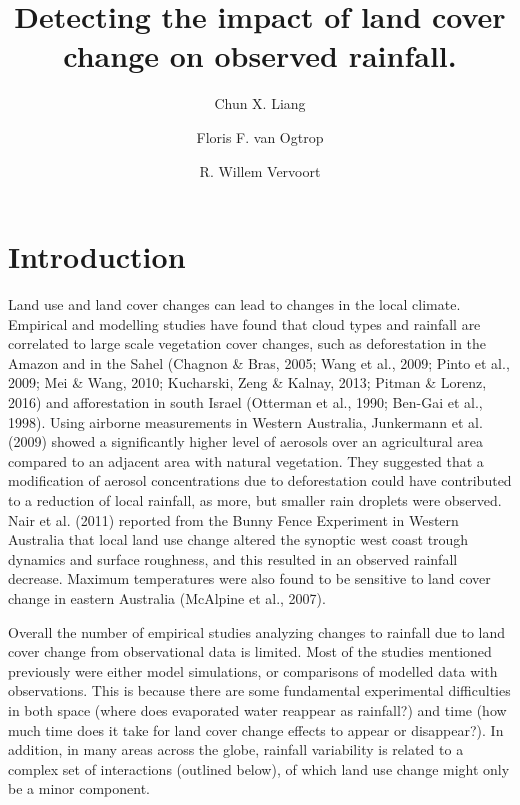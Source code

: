 \documentclass[fleqn,10pt,lineno]{wlpeerj} %
\title{Detecting the impact of land cover change on observed rainfall.}
\author[1]{Chun X. Liang}
\author[1]{Floris F. van Ogtrop}
\author[1]{R. Willem Vervoort}
\affil[1]{Sydney Institute of Agriculture, The University of Sydney, NSW 2006}
\theoremstyle{definition}
\theoremstyle{definition}
\theoremstyle{definition}
\theoremstyle{remark}
\begin{document}
\flushbottom
\maketitle
\thispagestyle{empty}

\section*{Introduction}\label{introduction}

Land use and land cover changes can lead to changes in the local
climate. Empirical and modelling studies have found that cloud types and
rainfall are correlated to large scale vegetation cover changes, such as
deforestation in the Amazon and in the Sahel (Chagnon \& Bras, 2005;
Wang et al., 2009; Pinto et al., 2009; Mei \& Wang, 2010; Kucharski,
Zeng \& Kalnay, 2013; Pitman \& Lorenz, 2016) and afforestation in south
Israel (Otterman et al., 1990; Ben-Gai et al., 1998). Using airborne
measurements in Western Australia, Junkermann et al. (2009) showed a
significantly higher level of aerosols over an agricultural area
compared to an adjacent area with natural vegetation. They suggested
that a modification of aerosol concentrations due to deforestation could
have contributed to a reduction of local rainfall, as more, but smaller
rain droplets were observed. Nair et al. (2011) reported from the Bunny
Fence Experiment in Western Australia that local land use change altered
the synoptic west coast trough dynamics and surface roughness, and this
resulted in an observed rainfall decrease. Maximum temperatures were
also found to be sensitive to land cover change in eastern Australia
(McAlpine et al., 2007).

Overall the number of empirical studies analyzing changes to rainfall
due to land cover change from observational data is limited. Most of the
studies mentioned previously were either model simulations, or
comparisons of modelled data with observations. This is because there
are some fundamental experimental difficulties in both space (where does
evaporated water reappear as rainfall?) and time (how much time does it
take for land cover change effects to appear or disappear?). In
addition, in many areas across the globe, rainfall variability is
related to a complex set of interactions (outlined below), of which land
use change might only be a minor component.
\end{document}
